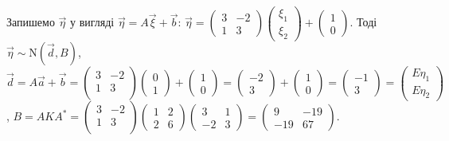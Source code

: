 \begin{example}
\begin{enumerate}
        Запишемо $\vec{\eta}$ у вигляді $\vec{\eta} = A\vec{\xi} + \vec{b}$: $\vec{\eta} = \begin{pmatrix}
            3 & -2 \\
            1 & 3 
        \end{pmatrix}\begin{pmatrix}
            \xi_1 \\ \xi_2
        \end{pmatrix} + \begin{pmatrix}
            1 \\ 0 
        \end{pmatrix}$. Тоді $\vec{\eta} \sim \mathrm{N}(\vec{d}, B)$,
        $\vec{d} = A\vec{a} + \vec{b} = \begin{pmatrix}
            3 & -2 \\
            1 & 3 \\
        \end{pmatrix}\begin{pmatrix}
            0 \\ 1
        \end{pmatrix} + \begin{pmatrix}
            1 \\ 0 
        \end{pmatrix} = \begin{pmatrix}
            -2 \\ 3 
        \end{pmatrix} + \begin{pmatrix}
            1 \\ 0
        \end{pmatrix} = \begin{pmatrix}
            -1 \\ 3
        \end{pmatrix} = \begin{pmatrix}
            E\eta_1 \\ E\eta_2
        \end{pmatrix}$, $B=A K A^{*} = \begin{pmatrix}
            3 & -2 \\
            1 & 3 \\
        \end{pmatrix}\begin{pmatrix}
            1 & 2 \\
            2 & 6
        \end{pmatrix}\begin{pmatrix}
            3 & 1 \\
            -2 & 3
        \end{pmatrix} = \begin{pmatrix}
            9 & -19 \\
            -19 & 67
        \end{pmatrix}$.


\end{enumerate}
\end{example}
